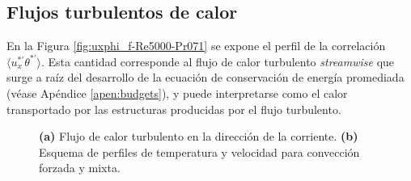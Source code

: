\subsection{Flujos turbulentos de calor} 

En la Figura \ref{fig:uxphi_f-Re5000-Pr071} se expone el perfil de la correlación $\langle u_x^{\ast \prime } \theta^{\ast \prime } \rangle$. Esta cantidad corresponde al flujo de calor turbulento \textit{streamwise} que surge a raíz del desarrollo de la ecuación de conservación de energía promediada (véase Apéndice \ref{apen:budgets}), y puede interpretarse como el calor transportado por las estructuras producidas por el flujo turbulento.  

\begin{figure}[H]
  \centering
    \caption{\textbf{(a)} Flujo de calor turbulento en la dirección de la corriente. \textbf{(b)} Esquema de perfiles de temperatura y velocidad para convección forzada y mixta. }
    \label{fig:rms-Re5000-Pr071}
\end{figure}

